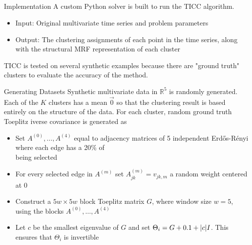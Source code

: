 \documentclass{beamer}
\DeclarePairedDelimiter \abs{\lvert}{\rvert}%
\begin{document}
\subsection{}

\begin{frame}{Implementation}
	A custom Python solver is built to run the TICC algorithm.
	\begin{itemize}
		\item Input: Original multivariate time series and problem parameters
		\item Output: The clustering assignments of each point in the time series, along with the structural MRF representation of each cluster
	\end{itemize}
	\vspace{.5cm}
	TICC is tested on several synthetic examples because there are "ground truth" clusters to evaluate the accuracy of the method. 
\end{frame}


\begin{frame}{Generating Datasets}
	Synthetic multivariate data in $\mathbb{R}^5$ is randomly generated. Each of the $K$ clusters has a mean $\vec{0}$ so that the clustering result is based entirely on the structure of the data. For each cluster, random ground truth Toeplitz iverse covariance is generated as 
	\begin{itemize}
		\item Set $A^{(0)}, \dots, A^{(4)}$ equal to adjacency matrices of 5 independent Erd\H{o}s-R\'{e}nyi where each edge has a 20\% of \\ being selected
		\item For every selected edge in $A^{(m)}$ set $A^{(m)}_{jk} = v_{jk,m}$ a random weight centered at 0
		\item Construct a $5w \times 5w$ block Toeplitz matrix $G$, where window size $w = 5$, using the blocks $A^{(0)}, \dots, A^{(4)}$
		\item Let $c$ be the smallest eigenvalue of $G$ and set $\Theta_i = G + 0.1 + \abs{c}I$. This ensures that $\Theta_i$ is invertible
	\end{itemize}
\end{frame}

\end{document}
